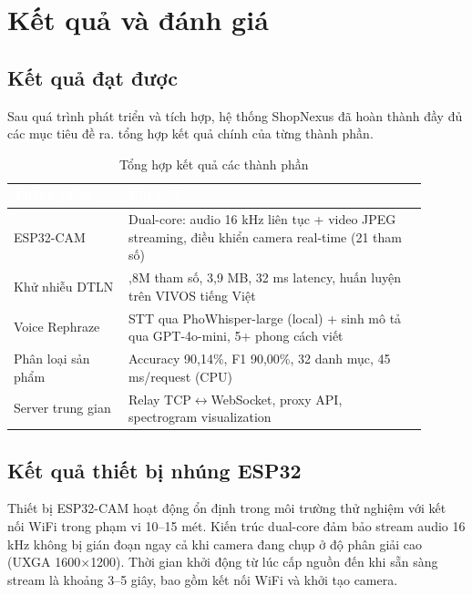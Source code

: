 \chapter{Kết quả và đánh giá}

\section{Kết quả đạt được}

Sau quá trình phát triển và tích hợp, hệ thống ShopNexus đã hoàn thành
đầy đủ các mục tiêu đề ra.  tổng hợp kết quả chính
của từng thành phần.

\begin{table}[htbp]
\centering
\caption{Tổng hợp kết quả các thành phần}
\label{tab:results}
\begin{tabular}{>{\raggedright\arraybackslash}p{0.25\linewidth} >{\raggedright\arraybackslash}p{0.65\linewidth}}
\toprule
\rowcolor{headerblue} \textcolor{white}{\textbf{Thành phần}} & \textcolor{white}{\textbf{Kết quả}} \\
\midrule
\rowcolor{rowgray} ESP32-CAM & Dual-core: audio 16 kHz liên tục + video JPEG streaming, điều khiển camera real-time (21 tham số) \\
Khử nhiễu DTLN & 1,8M tham số, 3,9 MB, 32 ms latency, huấn luyện trên VIVOS tiếng Việt \\
\rowcolor{rowgray} Voice Rephraze & STT qua PhoWhisper-large (local) + sinh mô tả qua GPT-4o-mini, 5+ phong cách viết \\
Phân loại sản phẩm & Accuracy 90,14\%, F1 90,00\%, 32 danh mục, 45 ms/request (CPU) \\
\rowcolor{rowgray} Server trung gian & Relay TCP$\leftrightarrow$WebSocket, proxy API, spectrogram visualization \\
\bottomrule
\end{tabular}
\end{table}

\section{Kết quả thiết bị nhúng ESP32}

Thiết bị ESP32-CAM hoạt động ổn định trong môi trường thử nghiệm với kết nối
WiFi trong phạm vi 10--15 mét. Kiến trúc dual-core đảm bảo stream audio 16 kHz
không bị gián đoạn ngay cả khi camera đang chụp ở độ phân giải cao (UXGA
1600$\times$1200). Thời gian khởi động từ lúc cấp nguồn đến khi sẵn sàng
stream là khoảng 3--5 giây, bao gồm kết nối WiFi và khởi tạo camera.


